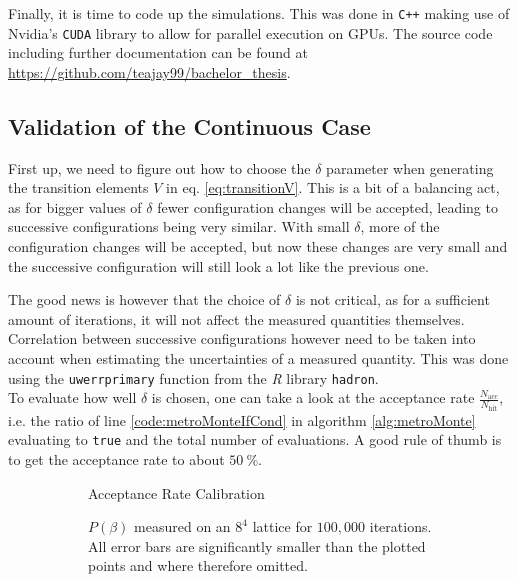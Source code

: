 Finally, it is time to code up the simulations. This was done in \texttt{C++} making use of Nvidia's \texttt{CUDA} library to allow for parallel execution on GPUs. The source code including further documentation can be found at \url{https://github.com/teajay99/bachelor_thesis}.\\

\subsection{Validation of the Continuous Case}

First up, we need to figure out how to choose the $\delta$ parameter when generating the transition elements $V$ in eq. \ref{eq:transitionV}. This is a bit of a balancing act, as for bigger values of $\delta$ fewer configuration changes will be accepted, leading to successive configurations being very similar. With small $\delta$, more of the configuration changes will be accepted, but now these changes are very small and the successive configuration will still look a lot like the previous one.

The good news is however that the choice of $\delta$ is not critical, as for a sufficient amount of iterations, it will not affect the measured quantities themselves. Correlation between successive configurations however need to be taken into account when estimating the uncertainties of a measured quantity. This was done using the \texttt{uwerrprimary} function from the \emph{R} library \texttt{hadron}.\\

To evaluate how well $\delta$ is chosen, one can take a look at the acceptance rate $\frac{N_{\textrm{acc}}}{N_{\textrm{hit}}}$, i.e. the ratio of line \ref{code:metroMonteIfCond} in algorithm \ref{alg:metroMonte} evaluating to \texttt{true} and the total number of evaluations. A good rule of thumb is to get the acceptance rate to about $\SI{50}{\%}$.
\begin{figure}[!hbt]
 \centering
 \begin{subfigure}[t]{0.49\textwidth}
  
  \caption{Acceptance Rate Calibration}
  \label{plot:calibHitRate}
 \end{subfigure}
 \begin{subfigure}[t]{0.49\textwidth}
  
  \caption{$P(\beta)$ measured on an $8^4$ lattice for $100,000$ iterations. All error bars are significantly smaller than the plotted points and where therefore omitted.}
  \label{plot:refDataSet}
 \end{subfigure}
 \caption{}
\end{figure}

